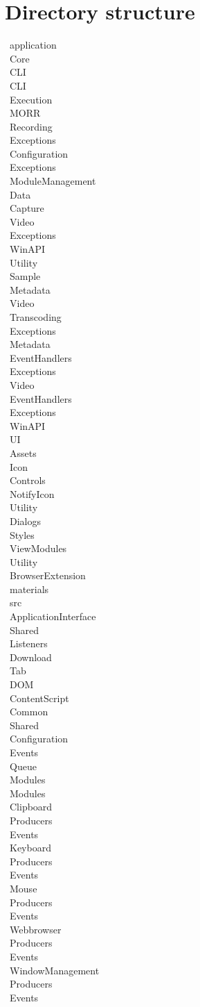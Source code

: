 \chapter{Directory structure}
\label{ch:dirstructure}
\newcommand{\tab}[1][1cm]{\hspace*{#1}}
\newcommand{\dir}[2]{\tab[#1cm] \textbullet \ #2 \\}

\dir{0}{application}
    \dir{0.5}{Core}
        \dir{1}{CLI}
            \dir{1.5}{CLI}
            \dir{1.5}{Execution}
        \dir{1}{MORR}
            \dir{1.5}{Recording}
                \dir{2}{Exceptions}
            \dir{1.5}{Configuration}
                \dir{2}{Exceptions}
            \dir{1.5}{ModuleManagement}
            \dir{1.5}{Data}
                \dir{2}{Capture}
                    \dir{2.5}{Video}
                        \dir{3}{Exceptions}
                        \dir{3}{WinAPI}
                            \dir{3.5}{Utility}
                \dir{2}{Sample}
                    \dir{2.5}{Metadata}
                    \dir{2.5}{Video}
                \dir{2}{Transcoding}
                    \dir{2.5}{Exceptions}
                    \dir{2.5}{Metadata}
                        \dir{3}{EventHandlers}
                        \dir{3}{Exceptions}
                    \dir{2.5}{Video}
                        \dir{3}{EventHandlers}
                        \dir{3}{Exceptions}
                    \dir{2.5}{WinAPI}
        \dir{1}{UI}
            \dir{1.5}{Assets}
                \dir{2}{Icon}
            \dir{1.5}{Controls}
                \dir{2}{NotifyIcon}
                \dir{2}{Utility}
            \dir{1.5}{Dialogs}
            \dir{1.5}{Styles}
            \dir{1.5}{ViewModules}
                \dir{2}{Utility}
    \dir{0.5}{BrowserExtension}
        \dir{1}{materials}
        \dir{1}{src}
            \dir{1.5}{ApplicationInterface}
            \dir{1.5}{Shared}
            \dir{1.5}{Listeners}
                \dir{2}{Download}
                \dir{2}{Tab}
                \dir{2}{DOM}
                    \dir{2.5}{ContentScript}
    \dir{0.5}{Common}
        \dir{1}{Shared}
            \dir{1.5}{Configuration}
            \dir{1.5}{Events}
                \dir{2}{Queue}
            \dir{1.5}{Modules}
    \dir{0.5}{Modules}
        \dir{1}{Clipboard}
            \dir{1.5}{Producers}
            \dir{1.5}{Events}
        \dir{1}{Keyboard}
            \dir{1.5}{Producers}
            \dir{1.5}{Events}
        \dir{1}{Mouse}
            \dir{1.5}{Producers}
            \dir{1.5}{Events}
        \dir{1}{Webbrowser}
            \dir{1.5}{Producers}
            \dir{1.5}{Events}
        \dir{1}{WindowManagement}
            \dir{1.5}{Producers}
            \dir{1.5}{Events}